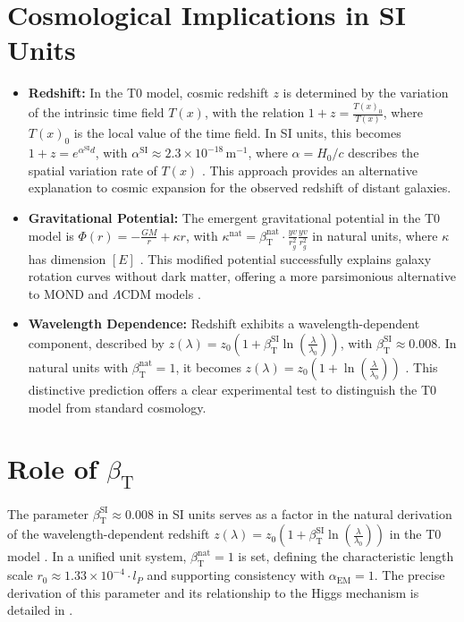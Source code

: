 \documentclass[12pt,a4paper]{article}
\newcommand{\Tfield}{T(x)}
\newcommand{\betaT}{\beta_{\text{T}}}
\newcommand{\alphaEM}{\alpha_{\text{EM}}}
\begin{document}
	\section{Cosmological Implications in SI Units}
	\begin{itemize}
		\item \textbf{Redshift:} In the T0 model, cosmic redshift \(z\) is determined by the variation of the intrinsic time field \(\Tfield\), with the relation \(1 + z = \frac{\Tfield_0}{\Tfield}\), where \(\Tfield_0\) is the local value of the time field. In SI units, this becomes \(1 + z = e^{\alpha^{\text{SI}} d}\), with \(\alpha^{\text{SI}} \approx 2.3 \times 10^{-18} \, \text{m}^{-1}\), where \(\alpha = H_0/c\) describes the spatial variation rate of \(\Tfield\) \cite{pascher_galaxies_2025, pascher_emergente_gravitation_2025}. This approach provides an alternative explanation to cosmic expansion for the observed redshift of distant galaxies.
		
		\item \textbf{Gravitational Potential:} The emergent gravitational potential in the T0 model is \(\Phi(r) = -\frac{GM}{r} + \kappa r\), with \(\kappa^{\text{nat}} = \betaT^{\text{nat}} \cdot \frac{yv}{r_g^2}\frac{y v}{r_g^2}\) in natural units, where \(\kappa\) has dimension \([E]\) \cite{pascher_emergente_gravitation_2025}. This modified potential successfully explains galaxy rotation curves without dark matter, offering a more parsimonious alternative to MOND \cite{Milgrom1983} and \(\Lambda\)CDM models \cite{Planck2018}.
		
		\item \textbf{Wavelength Dependence:} Redshift exhibits a wavelength-dependent component, described by \(z(\lambda) = z_0 \left(1 + \betaT^{\text{SI}} \ln\left(\frac{\lambda}{\lambda_0}\right)\right)\), with \(\betaT^{\text{SI}} \approx 0.008\). In natural units with \(\betaT^{\text{nat}} = 1\), it becomes \(z(\lambda) = z_0 \left(1 + \ln\left(\frac{\lambda}{\lambda_0}\right)\right)\) \cite{pascher_temp_2025, pascher_alphabeta_2025}. This distinctive prediction offers a clear experimental test to distinguish the T0 model from standard cosmology.
	\end{itemize}
	
	\section{Role of \(\betaT\)}
	The parameter \(\betaT^{\text{SI}} \approx 0.008\) in SI units serves as a factor in the natural derivation of the wavelength-dependent redshift \( z(\lambda) = z_0 \left(1 + \betaT^{\text{SI}} \ln\left(\frac{\lambda}{\lambda_0}\right)\right) \) in the T0 model \cite{pascher_alphabeta_2025}. In a unified unit system, \(\betaT^{\text{nat}} = 1\) is set, defining the characteristic length scale \( r_0 \approx 1.33 \times 10^{-4} \cdot l_P \) and supporting consistency with \(\alphaEM = 1\). The precise derivation of this parameter and its relationship to the Higgs mechanism is detailed in \cite{pascher_params_2025, pascher_higgs_2025}.
	
\end{document}
